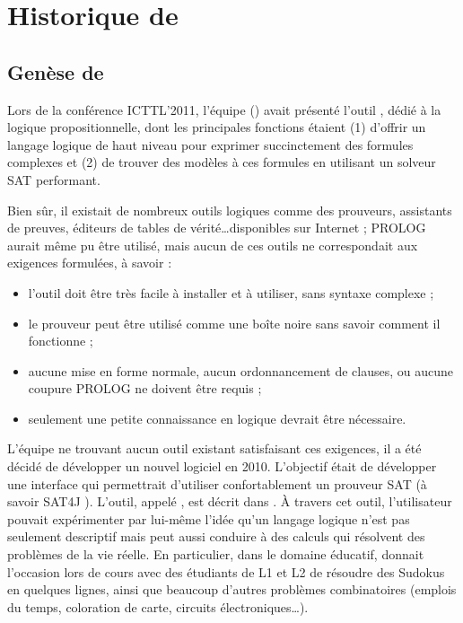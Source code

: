 \section{Historique de \touist}

\subsection{Genèse de \satoulouse}

Lors de la conférence ICTTL'2011, l'équipe (\citeauthor{GaScSt2011}) avait présenté l'outil \satoulouse \cite{GaScSt2011}, dédié à la logique propositionnelle, dont les principales fonctions étaient (1) d'offrir un langage logique de haut niveau pour exprimer succinctement des formules complexes et (2) de trouver des modèles à ces formules en utilisant un solveur SAT performant.

Bien sûr, il existait de nombreux outils logiques comme des prouveurs, assistants de preuves, éditeurs de tables de vérité\ldots disponibles sur Internet ; PROLOG aurait même pu être utilisé, mais aucun de ces outils ne correspondait aux exigences formulées, à savoir :
\begin{itemize}
\item l'outil doit être très facile à installer et à utiliser, sans syntaxe complexe ;
\item le prouveur peut être utilisé comme une boîte noire sans savoir comment il fonctionne ;
\item  aucune mise en forme normale,  aucun ordonnancement de clauses, ou aucune coupure PROLOG ne doivent être requis ;
\item seulement une petite connaissance en logique devrait être nécessaire.
\end{itemize} 

L'équipe ne trouvant aucun outil existant satisfaisant ces exigences, il a été décidé de développer un nouvel logiciel en 2010. L'objectif était de développer une interface qui permettrait d'utiliser confortablement un prouveur SAT (à savoir SAT4J \cite{DBLP:journals/jsat/BerreP10}). L'outil, appelé \satoulouse, est décrit dans \cite{GaScSt2011}. À travers cet outil, l'utilisateur pouvait expérimenter par lui-même l'idée qu'un langage logique n'est pas seulement descriptif mais peut aussi conduire à des calculs qui résolvent des problèmes de la vie réelle. En particulier, dans le domaine éducatif, \satoulouse donnait l'occasion lors de cours avec des étudiants de L1 et L2 de résoudre des Sudokus en quelques lignes, ainsi que beaucoup d'autres problèmes combinatoires (emplois du temps, coloration de carte, circuits électroniques\ldots).\


